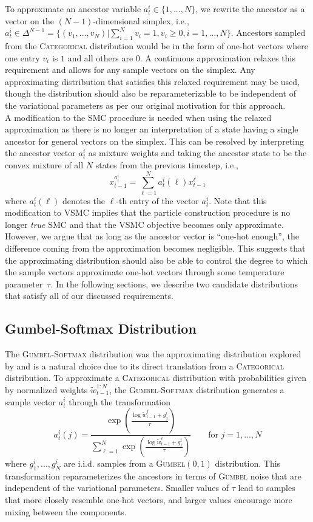 \documentclass[12pt]{article}
\newcommand{\vsmc}{\textsc{VSMC}\xspace}
\newcommand{\smc}{\textsc{SMC}\xspace}
\newcommand{\categorical}{\textsc{Categorical}\xspace}
\newcommand{\gumbelsoftmax}{\textsc{Gumbel-Softmax}\xspace}
\newcommand{\gumbel}{\textsc{Gumbel}\xspace}
\begin{document}
To approximate an ancestor variable $a_t^i\in\{1,...,N\}$, we rewrite the ancestor as a vector on the $(N-1)$-dimensional simplex, i.e., $a_t^i \in \Delta^{N-1}=\{(v_1,...,v_N)|\sum_{i=1}^Nv_i=1,v_i\geq0, i=1,...,N\}$. Ancestors sampled from the \categorical distribution would be in the form of one-hot vectors where one entry $v_i$ is $1$ and all others are $0$. A continuous approximation relaxes this requirement and allows for any sample vectors on the simplex. Any approximating distribution that satisfies this relaxed requirement may be used, though the distribution should also be reparameterizable to be independent of the variational parameters as per our original motivation for this approach.
\\

A modification to the \smc procedure is needed when using the relaxed approximation as there is no longer an interpretation of a state having a single ancestor for general vectors on the simplex. This can be resolved by interpreting the ancestor vector $a_t^i$ as mixture weights and taking the ancestor state to be the convex mixture of all $N$ states from the previous timestep, i.e.,
\[
x_{t-1}^{a_t^i} = \sum_{\ell=1}^Na_t^i(\ell)x_{t-1}^{\ell}
\]
where $a_t^i(\ell)$ denotes the $\ell$-th entry of the vector $a_t^i$. Note that this modification to \vsmc implies that the particle construction procedure is no longer \textit{true} \smc and that the \vsmc objective becomes only approximate. However, we argue that as long as the ancestor vector is ``one-hot enough'', the difference coming from the approximation becomes negligible. This suggests that the approximating distribution should also be able to control the degree to which the sample vectors approximate one-hot vectors through some temperature parameter~$\tau$. In the following sections, we describe two candidate distributions that satisfy all of our discussed requirements.

\subsection{Gumbel-Softmax Distribution}

The \gumbelsoftmax distribution \parencite{Jang:2017,Maddison:2017} was the approximating distribution explored by \textcite{Lawson:2018} and is a natural choice due to its direct translation from a \categorical distribution. To approximate a \categorical distribution with probabilities given by normalized weights $\tilde{w}_{t-1}^{1:N}$, the \gumbelsoftmax distribution generates a sample vector $a_t^i$ through the transformation
\[
a_t^i(j) = \frac{\exp\left(\frac{\log \tilde{w}_{t-1}^j+g_j^i}{\tau}\right)}{\sum_{\ell=1}^N\exp\left(\frac{\log \tilde{w}_{t-1}^\ell+g_\ell^i}{\tau}\right)} \qquad \text{for } j=1,...,N
\]
where $g_1^i,...,g_N^i$ are i.i.d. samples from a \textsc{Gumbel}$(0,1)$ distribution. This transformation reparameterizes the ancestors in terms of \gumbel noise that are independent of the variational parameters. Smaller values of $\tau$ lead to samples that more closely resemble one-hot vectors, and larger values encourage more mixing between the components.
\end{document}
